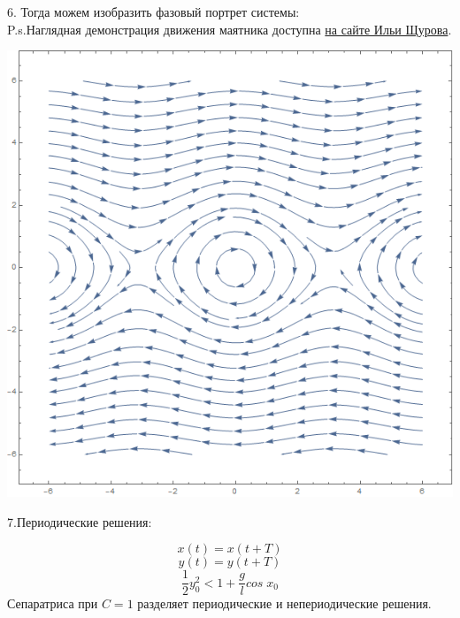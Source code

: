 \documentclass[10pt]{report}
\begin{document}
6. Тогда можем изобразить фазовый портрет системы:\\
P.s.Наглядная демонстрация движения маятника доступна \href{http://math-info.hse.ru/f/2015-16/nes-ode/pendulum.html}{на сайте Ильи Щурова}.
\begin{center} 
{\includegraphics[scale=0.66]{graph13.4.png}} 
\end{center}

7.Периодические решения:

\[x(t)=x(t+T)\]
\[y(t)=y(t+T)\]
\[\frac 1 2 y_0^2<1+\frac g l cos\; x_0\]
Сепаратриса при $C=1 $ разделяет периодические и непериодические решения. 
\end{document}

